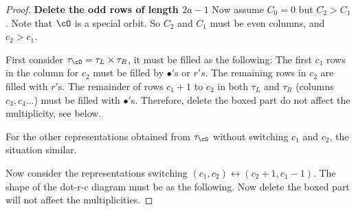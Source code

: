 \documentclass[12pt,a4paper]{amsart}
\numberwithin{equation}{section}
\theoremstyle{remark}
\begin{document}
\begin{proof}
    \textbf{Delete the odd rows of length $2a-1$} Now assume $C_0=0$ but
    $C_2>C_1$. Note that $\cO$ is a special orbit. So $C_2$ and $C_1$ must be
    even columns, and $c_2>c_1$.

    First consider $\tau_\cO = \tau_L\times \tau_R$, it must be filled as the
    following: The first $c_1$ rows in the column for $c_2$ must be filled by
    $\bullet'$s or $r's$. The remaining rows in $c_2$ are filled with $r'$s. The
    remainder of rows $c_1+1$ to $c_2$ in both $\tau_L$ and $\tau_R$ (columns
    $c_3, c_4\dots$) must be filled with $\bullet'$s.  Therefore, delete the
    boxed part do not affect the multiplicity, see below.




For the other representations obtained from $\tau_\cO$ without switching $c_1$
and $c_2$, the situation similar.

Now consider the representations switching
$(c_1,c_2)\leftrightarrow (c_2+1,c_1-1)$. The shape of the dot-r-c diagram must
be as the following. Now delete the boxed part will not affect the
multiplicities.


\end{proof}
\end{document}
